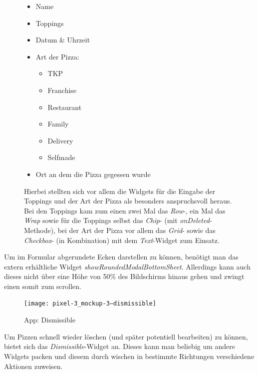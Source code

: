 \begin{figure}[H]
        \begin{itemize}
            \itemsep-0.4em
            \item Name
            \item Toppings
            \item Datum \& Uhrzeit
            \item Art der Pizza:
            \begin{itemize}
                \itemsep-0.4em
                \item \ac{TKP}
                \item Franchise
                \item Restaurant
                \item Family
                \item Delivery
                \item Selfmade
            \end{itemize}
            \item Ort an dem die Pizza gegessen wurde
        \end{itemize}

        Hierbei stellten sich vor allem die Widgets für die
        Eingabe der Toppings und der Art der Pizza als besonders
        anspruchsvoll heraus. Bei den Toppings kam zum einen
        zwei Mal das \textit{Row}-, ein Mal das \textit{Wrap}
        sowie für die Toppings selbst das \textit{Chip}-
        (mit \textit{onDeleted}-Methode), bei der
        Art der Pizza vor allem das \textit{Grid}- sowie
        das \textit{Checkbox}- (in Kombination) mit dem \textit{Text}-Widget
        zum Einsatz.
    \endminipage\hfill
\end{figure}
Um im Formular abgerundete Ecken darstellen zu können, benötigt man
das extern erhältliche Widget \textit{showRoundedModalBottomSheet}.
Allerdings kann auch dieses nicht über eine Höhe von 50\% des Bildschirms
hinaus gehen und zwingt einen somit zum scrollen.

\begin{figure}[H]
    \centering
    \texttt{[image: pixel-3\_mockup-3--dismissible]}
    \caption{App: Dismissible}
\end{figure}

Um Pizzen schnell wieder löschen (und später potentiell bearbeiten)
zu können, bietet sich das \textit{Dismissible}-Widget an.
Dieses kann man beliebig um andere Widgets packen und diesem
durch wischen in bestimmte Richtungen verschiedene Aktionen zuweisen.
